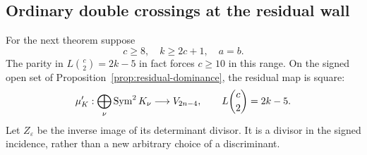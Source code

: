 \subsection{Ordinary double crossings at the residual wall}
For the next theorem suppose
\begin{equation}\label{eq:wall-hypotheses}
 c\ge8,\quad k\ge2c+1,\quad a=b.
\end{equation}
The parity in $L\binom c2=2k-5$ in fact forces $c\ge10$ in this
range. On the signed open set of
Proposition~\ref{prop:residual-dominance}, the residual map is square:
\[
 \mu_K':\bigoplus_\nu\operatorname{Sym}^2K_\nu\longrightarrow V_{2n-4},
 \qquad L\binom c2=2k-5.
\]
Let $Z_\varepsilon$ be the inverse image of its determinant divisor.
It is a divisor in the signed incidence, rather than a new arbitrary
choice of a discriminant.

